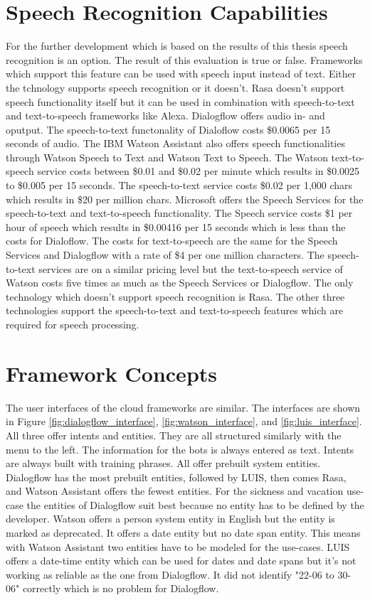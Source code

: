 \section*{Speech Recognition Capabilities}
For the further development which is based on the results of this thesis speech recognition 
is an option. 
The result of this evaluation is true or false.
Frameworks which support this feature can be used with speech input instead of text.
Either the tchnology supports speech recognition or it doesn't. 
Rasa doesn't support speech functionality itself but it can be used in combination with 
speech-to-text and text-to-speech frameworks like Alexa.
Dialogflow offers audio in- and oputput.
The speech-to-text functonality of Dialoflow costs \$0.0065 per 15 seconds of audio.
The IBM Watson Assistant also offers speech functionalities through Watson Speech to 
Text and Watson Text to Speech.
The Watson text-to-speech service costs between \$0.01 and \$0.02 per minute which results 
in \$0.0025 to \$0.005 per 15 seconds.
The speech-to-text service costs \$0.02 per 1,000 chars which results in 
\$20 per million chars.
Microsoft offers the Speech Services for the speech-to-text and text-to-speech functionality.
The Speech service costs \$1 per hour of speech which results in \$0.00416 per 15 seconds which is 
less than the costs for Dialoflow.
The costs for text-to-speech are the same for the Speech Services and Dialogflow with a 
rate of \$4 per one million characters.
The speech-to-text services are on a similar pricing level but the text-to-speech service of 
Watson costs five times as much as the Speech Services or Dialogflow.
The only technology which doesn't support speech recognition is Rasa.
The other three technologies support the speech-to-text and text-to-speech features 
which are required for speech processing.   


\section*{Framework Concepts}
The user interfaces of the cloud frameworks are similar.
The interfaces are shown in Figure \ref{fig:dialogflow_interface},
\ref{fig:watson_interface}, and \ref{fig:luis_interface}.
All three offer intents and entities.
They are all structured similarly with the menu to the left.
The information for the bots is always entered as text.
Intents are always built with training phrases.
All offer prebuilt system entities.
Dialogflow has the most prebuilt entities, followed by LUIS,
then comes Rasa, and Watson Assistant offers the fewest entities.
For the sickness and vacation use-case the entities of 
Dialogflow suit best because no entity has to be defined by 
the developer. 
Watson offers a person system entity in English but the entity
is marked as deprecated.
It offers a date entity but no date span entity.
This means with Watson Assistant two entities have to be 
modeled for the use-cases.
LUIS offers a date-time entity which can be used for dates and 
date spans but it's not working as reliable as the one from 
Dialogflow.
It did not identify "22-06 to 30-06" correctly
which is no problem for Dialogflow.



